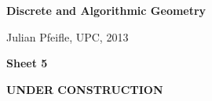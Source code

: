 \documentclass[11pt]{amsart}
\begin{document}
\begin{center}
\textbf{\sffamily
   Discrete and Algorithmic Geometry }

\medskip
   Julian Pfeifle,
   UPC, 2013 \mbox{}
\end{center}

\bigskip

\begin{center}
  \textbf{\sffamily Sheet 5}

\bigskip
\textbf{\sffamily UNDER CONSTRUCTION}

\end{center}

\bigskip



\end{document}
